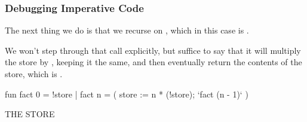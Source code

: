 \documentclass[aspectratio=169]{beamer}
\begin{document}
\begin{frame}[fragile]
  \frametitle{Debugging Imperative Code}

  \begin{minipage}[t][0.6in][t]{\textwidth}
    The next thing we do is that we recurse on , which in this case
    is .

    \vspace{\fill}

    We won't step through that call explicitly, but suffice to say that it will
    multiply the store by , keeping it the same, and then eventually return
    the contents of the store, which is .
  \end{minipage}

  \vspace{10pt}

  \begin{center}
    \begin{minipage}[t][1.7in][t]{0.6\textwidth}
      \vspace{\fill}
      \begin{codeblock}
        fun fact 0 = !store
          | fact n =
              ( store := n * (!store);
                `fact (n - 1)`
              )
      \end{codeblock}
      \vspace{\fill}
    \end{minipage}
    \hfill\vline\hfill
    \begin{minipage}[t][1.7in][t]{0.3\textwidth}
      \centering
      {\hspace{-20pt}\color{gray} \large THE STORE}

      \vspace{\fill}
      \vspace{\fill}
    \end{minipage}
  \end{center}
\end{frame}
\end{document}
